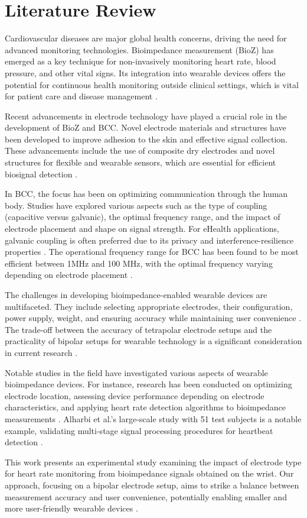 \section{Literature Review}
{
Cardiovascular diseases are major global health concerns, driving the need for advanced monitoring technologies. Bioimpedance measurement (BioZ) has emerged as a key technique for non-invasively monitoring heart rate, blood pressure, and other vital signs. Its integration into wearable devices offers the potential for continuous health monitoring outside clinical settings, which is vital for patient care and disease management \cite{OriginalSource1, towards, NewSource1}.

Recent advancements in electrode technology have played a crucial role in the development of BioZ and BCC. Novel electrode materials and structures have been developed to improve adhesion to the skin and effective signal collection. These advancements include the use of composite dry electrodes and novel structures for flexible and wearable sensors, which are essential for efficient biosignal detection \cite{PubMedArticle, NewSource2}.

In BCC, the focus has been on optimizing communication through the human body. Studies have explored various aspects such as the type of coupling (capacitive versus galvanic), the optimal frequency range, and the impact of electrode placement and shape on signal strength. For eHealth applications, galvanic coupling is often preferred due to its privacy and interference-resilience properties \cite{electrode_comp, NewSource3}. The operational frequency range for BCC has been found to be most efficient between 1MHz and 100 MHz, with the optimal frequency varying depending on electrode placement \cite{electrode_comp, NewSource4}.

The challenges in developing bioimpedance-enabled wearable devices are multifaceted. They include selecting appropriate electrodes, their configuration, power supply, weight, and ensuring accuracy while maintaining user convenience \cite{OriginalSource1, towards, NewSource5}. The trade-off between the accuracy of tetrapolar electrode setups and the practicality of bipolar setups for wearable technology is a significant consideration in current research \cite{towards, NewSource6}.

Notable studies in the field have investigated various aspects of wearable bioimpedance devices. For instance, research has been conducted on optimizing electrode location, assessing device performance depending on electrode characteristics, and applying heart rate detection algorithms to bioimpedance measurements \cite{towards, PubMedArticle, NewSource7}. Alharbi et al.'s large-scale study with 51 test subjects is a notable example, validating multi-stage signal processing procedures for heartbeat detection \cite{towards, NewSource8}.

This work presents an experimental study examining the impact of electrode type for heart rate monitoring from bioimpedance signals obtained on the wrist. Our approach, focusing on a bipolar electrode setup, aims to strike a balance between measurement accuracy and user convenience, potentially enabling smaller and more user-friendly wearable devices \cite{towards}.
}
